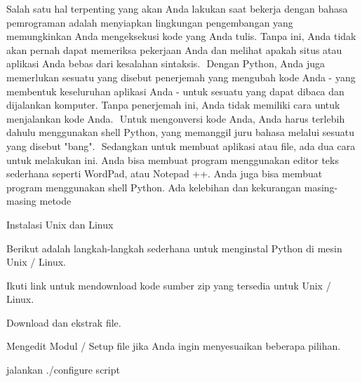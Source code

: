 {\fontsize{14pt}{14pt}\selectfont \vspace{\baselineskip}
Salah satu hal terpenting yang akan Anda lakukan saat bekerja dengan bahasa pemrograman adalah menyiapkan lingkungan pengembangan yang memungkinkan Anda mengeksekusi kode yang Anda tulis. Tanpa ini, Anda tidak akan pernah dapat memeriksa pekerjaan Anda dan melihat apakah situs atau aplikasi Anda bebas dari kesalahan sintaksis.  $  $ Dengan Python, Anda juga memerlukan sesuatu yang disebut penerjemah yang mengubah kode Anda - yang membentuk keseluruhan aplikasi Anda - untuk sesuatu yang dapat dibaca dan dijalankan komputer. Tanpa penerjemah ini, Anda tidak memiliki cara untuk menjalankan kode Anda.  $  $ Untuk mengonversi kode Anda, Anda harus terlebih dahulu menggunakan shell Python, yang memanggil juru bahasa melalui sesuatu yang disebut "bang".  $  $ Sedangkan untuk membuat aplikasi atau file, ada dua cara untuk melakukan ini. Anda bisa membuat program menggunakan editor teks sederhana seperti WordPad, atau Notepad ++. Anda juga bisa membuat program menggunakan shell Python. Ada kelebihan dan kekurangan masing-masing metode \\} \par
\vspace{14pt}
\noindent 
{\fontsize{14pt}{14pt}\selectfont Instalasi Unix dan Linux \\} \par
\noindent 
{\fontsize{14pt}{14pt}\selectfont Berikut adalah langkah-langkah sederhana untuk menginstal Python di mesin Unix / Linux. \\} \par
\noindent 
{\fontsize{14pt}{14pt}\selectfont Ikuti link untuk mendownload kode sumber zip yang tersedia untuk Unix / Linux. \\} \par
\vspace{14pt}
\noindent 
{\fontsize{14pt}{14pt}\selectfont Download dan ekstrak file. \\} \par
\vspace{14pt}
\noindent 
{\fontsize{14pt}{14pt}\selectfont Mengedit Modul / Setup file jika Anda ingin menyesuaikan beberapa pilihan. \\} \par
\vspace{14pt}
\noindent 
{\fontsize{14pt}{14pt}\selectfont jalankan ./configure script \\} \par
\vspace{14pt}

